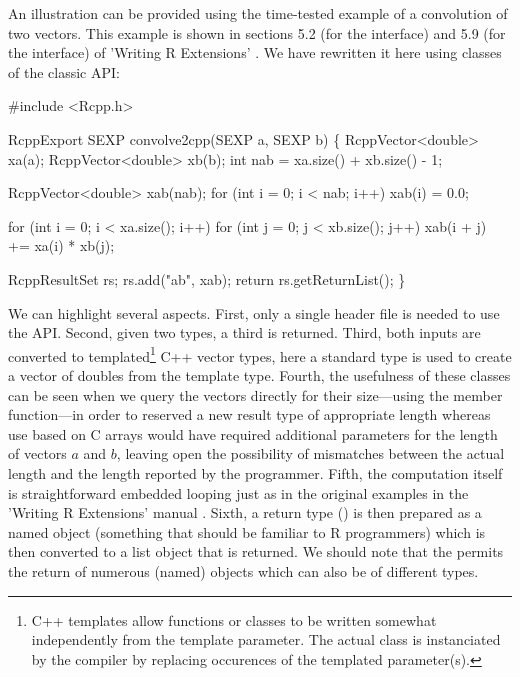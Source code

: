 An illustration can be provided using the time-tested example of a
convolution of two vectors. This example is shown in sections 5.2 (for the
 interface) and 5.9 (for the  interface) of 'Writing
R Extensions' \citep{R:exts}. We have rewritten it here using classes of the
classic  API:

\begin{example}
#include <Rcpp.h>

RcppExport SEXP convolve2cpp(SEXP a, SEXP b) \{
  RcppVector<double> xa(a);
  RcppVector<double> xb(b);
  int nab = xa.size() + xb.size() - 1;

  RcppVector<double> xab(nab);
  for (int i = 0; i < nab; i++) xab(i) = 0.0;

  for (int i = 0; i < xa.size(); i++)
    for (int j = 0; j < xb.size(); j++) 
       xab(i + j) += xa(i) * xb(j);

  RcppResultSet rs;
  rs.add("ab", xab);
  return rs.getReturnList();
\}
\end{example}

We can highlight several aspects. First, only a single header file
 is needed to use the  API.  Second, given two
 types, a third is returned.
Third, both inputs are converted to templated\footnote{C++ templates
allow functions or classes to be written somewhat independently from the 
template parameter. The actual class is instanciated by the compiler
by replacing occurences of the templated parameter(s).}
C++ vector types, here a standard 
type is used to create a vector of doubles from the template type.
Fourth, the usefulness of these classes can be seen when we query the
vectors directly for their size---using the  member function---in
order to reserved a new result type of appropriate length whereas use based
on C arrays would have required additional parameters for the length of
vectors $a$ and $b$, leaving open the possibility of mismatches between the
actual length and the length reported by the programmer. 
Fifth, the computation itself is straightforward embedded looping just as in the
original examples in the 'Writing R Extensions' manual \citep{R:exts}.
Sixth, a return type () is then prepared as a named
object (something that should be familiar to R programmers) which is then
converted to a list object that is returned.  We should note that the
 permits the return of numerous (named) objects which can
also be of different types.

